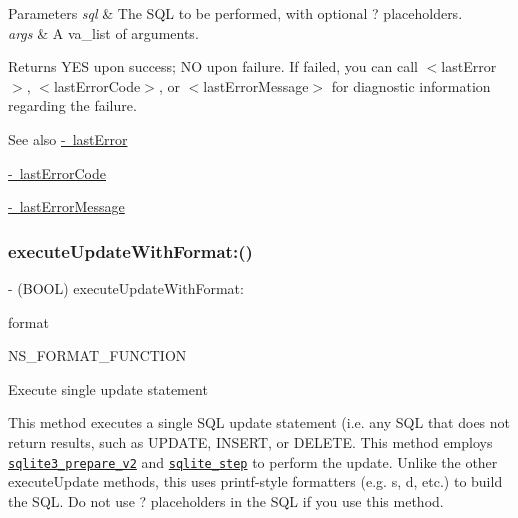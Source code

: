 \begin{DoxyParams}{Parameters}
{\em sql} & The S\+QL to be performed, with optional {\ttfamily ?} placeholders.\\
\hline
{\em args} & A {\ttfamily va\+\_\+list} of arguments.\\
\hline
\end{DoxyParams}
\begin{DoxyReturn}{Returns}
{\ttfamily Y\+ES} upon success; {\ttfamily NO} upon failure. If failed, you can call {\ttfamily $<$last\+Error$>$}, {\ttfamily $<$last\+Error\+Code$>$}, or {\ttfamily $<$last\+Error\+Message$>$} for diagnostic information regarding the failure.
\end{DoxyReturn}
\begin{DoxySeeAlso}{See also}
\mbox{\hyperlink{interface_o_p_t_l_y_f_m_d_b_database_a477a6ff4d9daaac53a56c0a058a0d2f7}{-\/ last\+Error}} 

\mbox{\hyperlink{interface_o_p_t_l_y_f_m_d_b_database_a9f15cf87d3c764783ce0c6beb39393a9}{-\/ last\+Error\+Code}} 

\mbox{\hyperlink{interface_o_p_t_l_y_f_m_d_b_database_a082c5d58576df07956308656064e1f63}{-\/ last\+Error\+Message}} 
\end{DoxySeeAlso}
\mbox{\label{interface_o_p_t_l_y_f_m_d_b_database_a5c251162dad20491a8b2a6278812c2e6}} 
\subsubsection{\texorpdfstring{execute\+Update\+With\+Format\+:()}{executeUpdateWithFormat:()}}
{\footnotesize\ttfamily -\/ (B\+O\+OL) execute\+Update\+With\+Format\+: \begin{DoxyParamCaption}\item[{(N\+S\+String $\ast$)}]{format }\item[{,(1)}]{ }\item[{(2)}]{N\+S\+\_\+\+F\+O\+R\+M\+A\+T\+\_\+\+F\+U\+N\+C\+T\+I\+ON }\end{DoxyParamCaption}}

Execute single update statement

This method executes a single S\+QL update statement (i.\+e. any S\+QL that does not return results, such as {\ttfamily U\+P\+D\+A\+TE}, {\ttfamily I\+N\+S\+E\+RT}, or {\ttfamily D\+E\+L\+E\+TE}. This method employs \href{http://sqlite.org/c3ref/prepare.html}{\tt {\ttfamily sqlite3\+\_\+prepare\+\_\+v2}} and \href{http://sqlite.org/c3ref/step.html}{\tt {\ttfamily sqlite\+\_\+step}} to perform the update. Unlike the other {\ttfamily execute\+Update} methods, this uses printf-\/style formatters (e.\+g. {\ttfamily s}, {\ttfamily d}, etc.) to build the S\+QL. Do not use {\ttfamily ?} placeholders in the S\+QL if you use this method.


